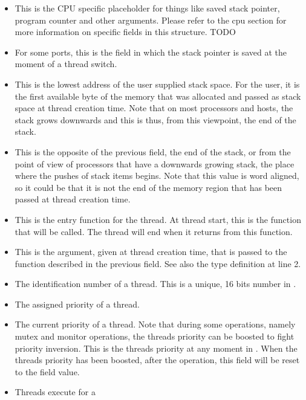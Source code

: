 \begin{itemize}
\item {} This is the CPU specific
placeholder for things like saved stack pointer, program counter and other
arguments. Please refer to the cpu section for more information on specific
fields in this structure. TODO
\item {} For some ports, this is the field
in which the stack pointer is saved at the moment of a thread switch.
\item {} This is the lowest address of
the user supplied stack space. For the user, it is the first available byte of
the memory that was allocated and passed as stack space at thread creation
time. Note that on most processors and hosts, the stack grows downwards and
this is thus, from this viewpoint, the end of the stack.
\item {} This is the opposite of the
previous field, the end of the stack, or from the point of view of
processors that have a downwards growing stack, the place where the pushes
of stack items begins. Note that this value is word aligned, so it could be
that it is not the end of the memory region that has been passed at thread
creation time.
\item {} This is the entry function for
the thread. At thread start, this is the function that will be called. The
thread will end when it returns from this function.
\item {} This is the argument, given at
thread creation time, that is passed to the function described in the
previous field. See also the type definition at line 2.
\item {} The identification number of a
thread. This is a unique, 16 bits number in \oswald.
\item {} The assigned priority of a
thread.
\item {} The current priority of a
thread. Note that during some operations, namely mutex and monitor
operations, the threads priority can be boosted to fight priority inversion.
This is the threads priority at any moment in \oswald. When the threads
priority has been boosted, after the operation, this field will be reset to
the  field value.
\item {} Threads execute for a

\end{itemize}

